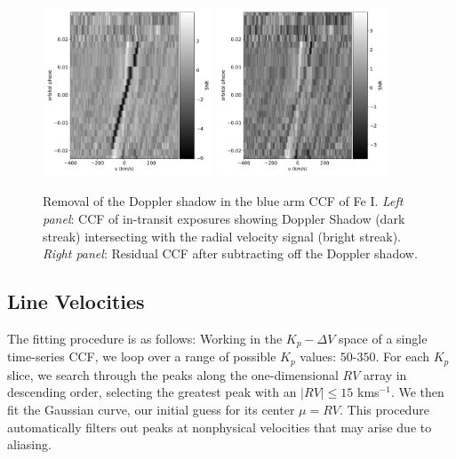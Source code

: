\documentclass[twocolumn]{aastex631}
\begin{document}
                \begin{figure}
                    \centering
                    \includegraphics[width=0.45\textwidth]{plots/raw-ccf-before/KELT-20b.20190504.Fe.blue.CCFs-raw.pdf}
                    \hspace{0.05\textwidth}
                    \includegraphics[width=0.45\textwidth]{plots/raw-ccf-after/KELT-20b.20190504.Fe.blue.CCFs-raw.pdf}
                    \caption{Removal of the Doppler shadow in the blue arm CCF of Fe I. \textit{Left panel}: CCF of in-transit exposures showing Doppler Shadow (dark streak) intersecting with the radial velocity signal (bright streak). \textit{Right panel}: Residual CCF after subtracting off the Doppler shadow.}
                    \label{fig:doppler-shadow-removal}
                \end{figure}
            
        \subsection{Line Velocities}\label{subsec:Line Velocities}
            The fitting procedure is as follows: Working in the ${K_p-\Delta\!V}$ space of a single time-series CCF, we loop over a range of possible $K_p$ values: $50$-$350$. For each $K_p$ slice, we search through the peaks along the one-dimensional $RV$ array in descending order, selecting the greatest peak with an $|RV| \leq 15$ kms$^{-1}$. We then fit the Gaussian curve, our initial guess for its center $\mu = RV$. This procedure automatically filters out peaks at nonphysical velocities that may arise due to aliasing.
            
\end{document}
